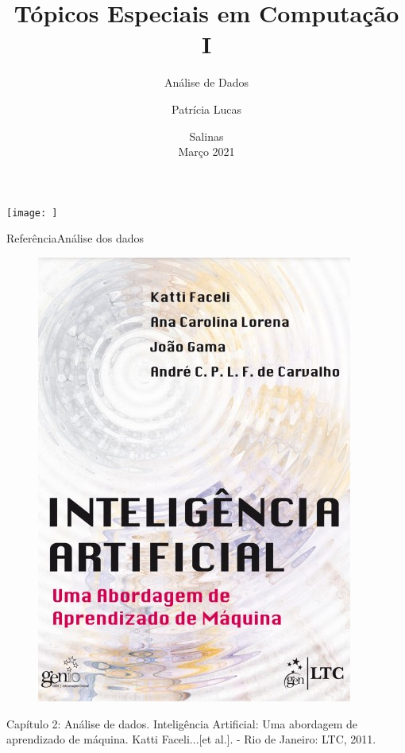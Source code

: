 \documentclass[t]{beamer}
\title[]{Tópicos Especiais em Computação I}
\subtitle[]{Análise de Dados}
\author[]{Patrícia Lucas\\{\footnotesize }}
\institute{Bacharelado em Sistemas de Informação \\ IFNMG  - Campus Salinas}
\date{\scriptsize Salinas\\Março 2021}
\begin{document}
\begin{frame}

\begin{center}
\texttt{[image: ]}
\end{center}
  \titlepage
\end{frame}

\begin{ftst}{Referência}{Análise dos dados}

\begin{figure}
    \includegraphics[scale=0.35]{Figuras/slide01_11.jpg}
\end{figure}
Capítulo 2: Análise de dados.
\vone
\scriptsize
Inteligência Artificial: Uma abordagem de aprendizado de máquina. Katti Faceli...[et al.]. - Rio de Janeiro: LTC, 2011.

\end{ftst}
\end{document}
